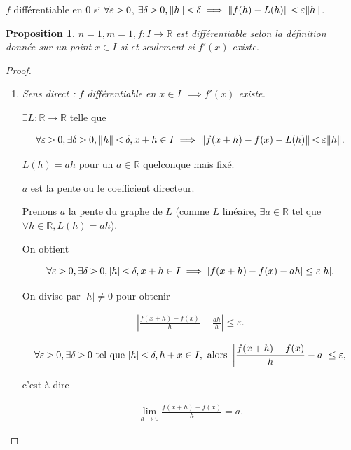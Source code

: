 \documentclass[french]{article}
\newtheorem{prop}{Proposition}[section]
\newcommand{\lesss}{\rotatebox[origin=c]{90}{$\land$}}
\newcommand{\less}{\ \lesss\ }
\newcommand{\biggg}{\rotatebox[origin=c]{90}{$\lor$}}
\newcommand{\bg}{\ \biggg\ }
\begin{document}
$f$ différentiable en 0 si $\forall \varepsilon  \bg 0$, $\exists \delta \bg 0, \Vert h \Vert \less \delta \implies \Vert f(h) - L(h) \Vert \less \varepsilon \Vert h \Vert  $.

\begin{prop}
  $n=1, m=1, f : I \to \mathbb{R}$ est différentiable selon la définition donnée sur un point $x \in I$ si et seulement si $f'(x)$ existe.
\end{prop}

\begin{proof}

  \

  \begin{enumerate}
    \item \emph{Sens direct : $f$ différentiable en $x \in I$ $\implies f'(x)$ existe.}

    $\exists L : \mathbb{R} \to \mathbb{R}$ telle que

    $$ \forall \varepsilon \bg 0, \exists \delta \bg 0, \Vert h \Vert \less \delta , x+h \in I \implies \Vert f(x+h) - f(x) -L(h) \Vert \less \varepsilon \Vert h \Vert.$$

    $L(h) = ah$ pour un $a \in \mathbb{R}$ quelconque mais fixé.

    $a$ est la pente ou le coefficient directeur.

    Prenons $a$   la pente du graphe de $L$ (comme $L$ linéaire, $\exists a \in \mathbb{R}$ tel que $\forall h \in \mathbb{R}, L(h) = ah$).

    On obtient

    $$ \forall \varepsilon \bg 0, \exists \delta \bg 0, \lvert h \rvert \less \delta , x+h \in I \implies \lvert f(x+h) -f(x)-ah \rvert \leq \varepsilon \lvert h \rvert.$$

    On divise par $\lvert h \rvert \neq 0$ pour obtenir

    \begin{gather*}
      \left\lvert \frac{f(x+h)-f(x)}{h} - \frac{ah}{h} \right\rvert \leq \varepsilon.
    \end{gather*}

    \begin{gather*}
      \forall \varepsilon  \bg 0, \exists \delta  \bg 0 \text{ tel que } \lvert h \rvert \less \delta , h+x \in I, \text{ alors } \left\lvert \frac{f(x+h)-f(x)}{h}-a \right\rvert \leq \varepsilon,
    \end{gather*}

    c'est à dire

    \begin{gather*}
      \lim_{h \to 0} \frac{f(x+h)-f(x)}{h} = a.
    \end{gather*}


\end{enumerate}
\end{proof}
\end{document}
